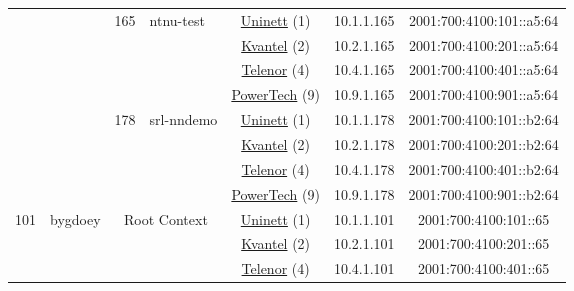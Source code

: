 \begin{small}
\begin{center}
\begin{longtable}{|c|c|c|c|c|c|c|c|}
  &  & \multirow{4}{*}{\tiny{165}} & \multicolumn{1}{|l|}{\multirow{4}{*}{\tiny{ntnu-test}}} & \multicolumn{2}{|c|}{\tiny{\href{https://www.uninett.no}{Uninett} (1)}} & \tiny{10.1.1.165} & \tiny{2001:700:4100:101::a5:64} \\* \cline{5-5}\cline{6-6}\cline{7-7}\cline{8-8}
  &  &  &  & \multicolumn{2}{|c|}{\tiny{\href{http://kvantel.no}{Kvantel} (2)}} & \tiny{10.2.1.165} & \tiny{2001:700:4100:201::a5:64} \\* \cline{5-5}\cline{6-6}\cline{7-7}\cline{8-8}
  &  &  &  & \multicolumn{2}{|c|}{\tiny{\href{https://www.telenor.no}{Telenor} (4)}} & \tiny{10.4.1.165} & \tiny{2001:700:4100:401::a5:64} \\* \cline{5-5}\cline{6-6}\cline{7-7}\cline{8-8}
  &  &  &  & \multicolumn{2}{|c|}{\tiny{\href{http://www.powertech.no}{PowerTech} (9)}} & \tiny{10.9.1.165} & \tiny{2001:700:4100:901::a5:64} \\* \cline{3-3}\cline{4-4}\cline{5-5}\cline{6-6}\cline{7-7}\cline{8-8}
  &  & \multirow{4}{*}{\tiny{178}} & \multicolumn{1}{|l|}{\multirow{4}{*}{\tiny{srl-nndemo}}} & \multicolumn{2}{|c|}{\tiny{\href{https://www.uninett.no}{Uninett} (1)}} & \tiny{10.1.1.178} & \tiny{2001:700:4100:101::b2:64} \\* \cline{5-5}\cline{6-6}\cline{7-7}\cline{8-8}
  &  &  &  & \multicolumn{2}{|c|}{\tiny{\href{http://kvantel.no}{Kvantel} (2)}} & \tiny{10.2.1.178} & \tiny{2001:700:4100:201::b2:64} \\* \cline{5-5}\cline{6-6}\cline{7-7}\cline{8-8}
  &  &  &  & \multicolumn{2}{|c|}{\tiny{\href{https://www.telenor.no}{Telenor} (4)}} & \tiny{10.4.1.178} & \tiny{2001:700:4100:401::b2:64} \\* \cline{5-5}\cline{6-6}\cline{7-7}\cline{8-8}
  &  &  &  & \multicolumn{2}{|c|}{\tiny{\href{http://www.powertech.no}{PowerTech} (9)}} & \tiny{10.9.1.178} & \tiny{2001:700:4100:901::b2:64} \\ \hline
 \multirow{40}{*}{\tiny{101}} & \multicolumn{1}{|l|}{\multirow{40}{*}{\tiny{bygdoey}}} & \multicolumn{2}{|c|}{\multirow{4}{*}{\tiny{Root Context}}} & \multicolumn{2}{|c|}{\tiny{\href{https://www.uninett.no}{Uninett} (1)}} & \tiny{10.1.1.101} & \tiny{2001:700:4100:101::65} \\* \cline{5-5}\cline{6-6}\cline{7-7}\cline{8-8}
  &  & \multicolumn{2}{|c|}{} & \multicolumn{2}{|c|}{\tiny{\href{http://kvantel.no}{Kvantel} (2)}} & \tiny{10.2.1.101} & \tiny{2001:700:4100:201::65} \\* \cline{5-5}\cline{6-6}\cline{7-7}\cline{8-8}
  &  & \multicolumn{2}{|c|}{} & \multicolumn{2}{|c|}{\tiny{\href{https://www.telenor.no}{Telenor} (4)}} & \tiny{10.4.1.101} & \tiny{2001:700:4100:401::65} \\* \cline{5-5}\cline{6-6}\cline{7-7}\cline{8-8}

\end{longtable}
\end{center}
\end{small}
